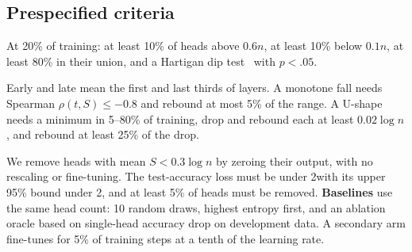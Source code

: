 \begin{table}[t]
    \centering
    \small
    \caption{Training configurations, 68 runs in total. Accuracies are seed means. All other models are pre-LN unless stated, and all use 41 checkpoints, dense over the first 20\% of training.}
    \label{tab:configs}
\end{table}

\subsection{Prespecified criteria}

 At 20\% of training: at least 10\% of heads above $0.6n$, at least 10\% below $0.1n$, at least 80\% in their union, and a Hartigan dip test~\citep{hartigan1985dip} with $p<.05$.

 Early and late mean the first and last thirds of layers. A monotone fall needs Spearman $\rho(t,S)\le-0.8$ and rebound at most 5\% of the range. A U-shape needs a minimum in 5--80\% of training, drop and rebound each at least $0.02\log n$, and rebound at least 25\% of the drop.

 We remove heads with mean $S<0.3\log n$ by zeroing their output, with no rescaling or fine-tuning. The test-accuracy loss must be under 2\pp with its upper 95\% bound under 2\pp, and at least 5\% of heads must be removed. {\bf Baselines} use the same head count: 10 random draws, highest entropy first, and an ablation oracle based on single-head accuracy drop on development data. A secondary arm fine-tunes for 5\% of training steps at a tenth of the learning rate.

